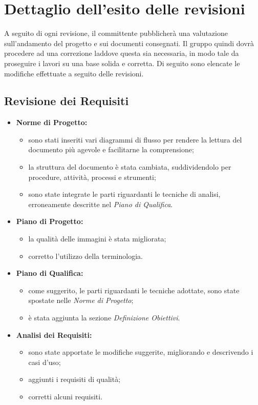 \section{Dettaglio dell'esito delle revisioni}
A seguito di ogni revisione, il committente pubblicherà una valutazione sull'andamento del progetto e sui documenti consegnati. Il gruppo quindi dovrà procedere ad una correzione laddove questa sia necessaria, in modo tale da proseguire i lavori su una base solida e corretta.
Di seguito sono elencate le modifiche effettuate a seguito delle revisioni.

\subsection{Revisione dei Requisiti}
\begin{itemize}
 \item \textbf{Norme di Progetto:} 
 	\begin{itemize}
 		\item sono stati inseriti vari diagrammi di flusso per rendere la lettura del documento più agevole e facilitarne la comprensione;
 		\item la struttura del documento è stata cambiata, suddividendolo per procedure, attività, processi e strumenti;
 		\item sono state integrate le parti riguardanti le tecniche di analisi, erroneamente descritte nel \textit{Piano di Qualifica}.
 	\end{itemize}
 	
 \item \textbf{Piano di Progetto:} 
 	\begin{itemize}
 		\item la qualità delle immagini è stata migliorata;
 		\item corretto l'utilizzo della terminologia.
 	\end{itemize}
 \item \textbf{Piano di Qualifica:}
 	\begin{itemize}
 		\item come suggerito, le parti riguardanti le tecniche adottate, sono state spostate nelle \textit{Norme di Progetto};
 		\item è stata aggiunta la sezione \textit{Definizione Obiettivi}.
 	\end{itemize}
 \item \textbf{Analisi dei Requisiti:}
 	\begin{itemize}
		\item sono state apportate le modifiche suggerite, migliorando e descrivendo i casi d'uso;
		\item aggiunti i requisiti di qualità;
		\item corretti alcuni requisiti.
 	\end{itemize}
\end{itemize}


